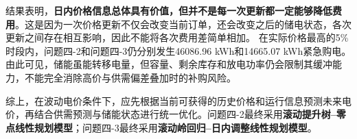 结果表明，\textbf{日内价格信息总体具有价值，但并不是每一次更新都一定能够降低费用}。这是因为一次价格更新不仅会改变当前订单，还会改变之后的储电状态，各次更新之间存在相互影响，因此不能将各次费用差简单相加。
在实际价格最高的5\%时段内，问题四-2和问题四-3仍分别发生46086.96 kWh和14665.07 kWh紧急购电。由此可见，储能虽能转移电量，但容量、剩余库存和放电功率仍会限制其缓冲能力，不能完全消除高价与供需偏差叠加时的补购风险。

综上，在波动电价条件下，应先根据当前可获得的历史价格和运行信息预测未来电价，再结合供需预测与储能状态进行统一优化。问题四-2最终采用\textbf{滚动提升树--零点线性规划模型}；问题四-3最终采用\textbf{滚动岭回归--日内调整线性规划模型}。
